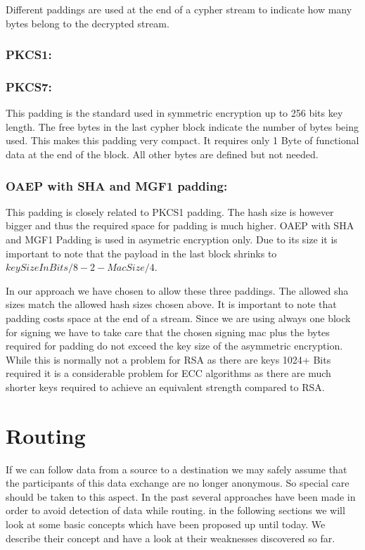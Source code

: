 Different paddings are used at the end of a cypher stream to indicate how many bytes belong to the decrypted stream.
\subsubsection{PKCS1:}  

\subsubsection{PKCS7:} This padding is the standard used in symmetric encryption up to 256 bits key length. The free bytes in the last cypher block indicate the number of bytes being used. This makes this padding very compact. It requires only 1 Byte of functional data at the end of the block. All other bytes are defined but not needed.

\subsubsection{OAEP with SHA and MGF1 padding:} This padding is closely related to PKCS1 padding. The hash size is however bigger and thus the required space for padding is much higher. OAEP with SHA and MGF1 Padding is used in asymetric encryption only. Due to its size it is important to note that the payload in the last block shrinks to $keySizeInBits/8-2-MacSize/4$.

In our approach we have chosen to allow these three paddings. The allowed sha sizes match the allowed hash sizes chosen above. It is important to note that padding costs space at the end of a stream. Since we are using always one block for signing we have to take care that the chosen signing mac plus the bytes required for padding do not exceed the key size of the asymmetric encryption. While this is normally not a problem for RSA as there are keys 1024+ Bits required it is a considerable problem for ECC algorithms as there are much shorter keys required to achieve an equivalent strength compared to RSA.

\section{Routing}
If we can follow data from a source to a destination we may safely assume that the participants of this data exchange are no longer anonymous. So special care should be taken to this aspect. In the past several approaches have been made in order to avoid detection of data while routing. in the following sections we will look at some basic concepts which have been proposed up until today. We describe their concept and have a look at their weaknesses discovered so far.

